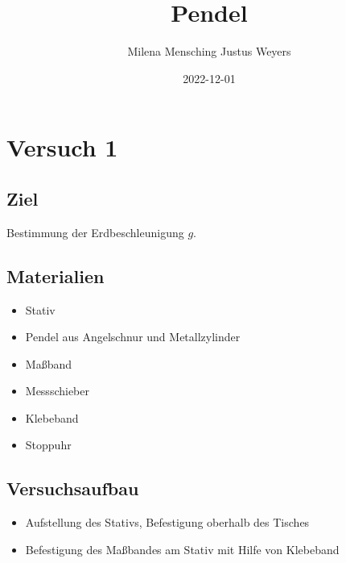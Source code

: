 \documentclass[
  9pt,
]{article}
\title{Pendel}
\author{Milena Mensching Justus Weyers}
\date{2022-12-01}
\providecommand{\tightlist}{%
  \setlength{\itemsep}{0pt}\setlength{\parskip}{0pt}}
\begin{document}
\maketitle

\hypertarget{versuch-1}{%
\section{Versuch 1}\label{versuch-1}}

\hypertarget{ziel}{%
\subsection{Ziel}\label{ziel}}

Bestimmung der Erdbeschleunigung \(g\).

\hypertarget{materialien}{%
\subsection{Materialien}\label{materialien}}

\begin{itemize}
\tightlist
\item
  Stativ
\item
  Pendel aus Angelschnur und Metallzylinder
\item
  Maßband
\item
  Messschieber
\item
  Klebeband
\item
  Stoppuhr
\end{itemize}

\hypertarget{versuchsaufbau}{%
\subsection{Versuchsaufbau}\label{versuchsaufbau}}

\begin{itemize}
\tightlist
\item
  Aufstellung des Stativs, Befestigung oberhalb des Tisches
\item
  Befestigung des Maßbandes am Stativ mit Hilfe von Klebeband
\end{itemize}
\end{document}
